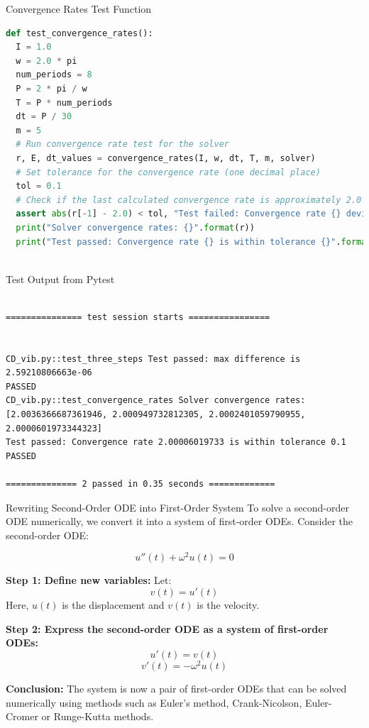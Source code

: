 \documentclass[10pt, aspectratio=54]{beamer}
\begin{document}
\begin{frame}[fragile]{Convergence Rates Test Function}
	
	\begin{lstlisting}[language=Python]
def test_convergence_rates():
  I = 1.0
  w = 2.0 * pi
  num_periods = 8
  P = 2 * pi / w
  T = P * num_periods
  dt = P / 30
  m = 5
  # Run convergence rate test for the solver
  r, E, dt_values = convergence_rates(I, w, dt, T, m, solver)	
  # Set tolerance for the convergence rate (one decimal place)
  tol = 0.1	
  # Check if the last calculated convergence rate is approximately 2.0
  assert abs(r[-1] - 2.0) < tol, "Test failed: Convergence rate {} deviates from expected 2.0".format(r[-1])
  print("Solver convergence rates: {}".format(r))
  print("Test passed: Convergence rate {} is within tolerance {}".format(r[-1], tol))
		
	\end{lstlisting}
\end{frame}

\begin{frame}[fragile]{Test Output from Pytest}
	
	\begin{lstlisting}

=============== test session starts ================


CD_vib.py::test_three_steps Test passed: max difference is 2.59210806663e-06
PASSED
CD_vib.py::test_convergence_rates Solver convergence rates: [2.0036366687361946, 2.000949732812305, 2.0002401059790955, 2.0000601973344323]
Test passed: Convergence rate 2.00006019733 is within tolerance 0.1
PASSED

============== 2 passed in 0.35 seconds =============
	\end{lstlisting}
\end{frame}

\begin{frame}{Rewriting Second-Order ODE into First-Order System}
	\justifying
	To solve a second-order ODE numerically, we convert it into a system of first-order ODEs. Consider the second-order ODE:
	
	\[
	u''(t) + \omega^2 u(t) = 0
	\]
	
	\textbf{Step 1: Define new variables:}
	Let:
	\[
	v(t) = u'(t)
	\]
	Here, \( u(t) \) is the displacement and \( v(t) \) is the velocity.
	
	\textbf{Step 2: Express the second-order ODE as a system of first-order ODEs:}
	\[
	u'(t) = v(t)
	\]
	\[
	v'(t) = -\omega^2 u(t)
	\]
	
	
	\textbf{Conclusion:} The system is now a pair of first-order ODEs that can be solved numerically using methods such as Euler’s method, Crank-Nicolson, Euler-Cromer or Runge-Kutta methods.
\end{frame}
\end{document}
